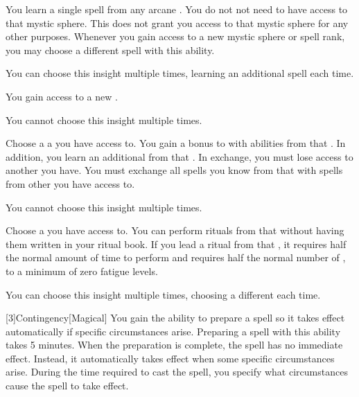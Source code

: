         {
             You learn a single spell from any arcane .
            You do not not need to have access to that mystic sphere.
            This does not grant you access to that mystic sphere for any other purposes.
            Whenever you gain access to a new mystic sphere or spell rank, you may choose a different spell with this ability.
            \par You can choose this insight multiple times, learning an additional spell each time.

             You gain access to a new .
            \par You cannot choose this insight multiple times.

             Choose a a  you have access to.
            You gain a  bonus to  with abilities from that .
            In addition, you learn an additional  from that .
            In exchange, you must lose access to another  you have.
            You must exchange all spells you know from that  with spells from other  you have access to.
            \par You cannot choose this insight multiple times.

            Choose a  you have access to.
            You can perform rituals from that  without having them written in your ritual book.
            If you lead a ritual from that , it requires half the normal amount of time to perform and requires half the normal number of , to a minimum of zero fatigue levels.
            \par You can choose this insight multiple times, choosing a different  each time.
        }

        [3]{Contingency}[Magical] You gain the ability to prepare a spell so it takes effect automatically if specific circumstances arise.
        Preparing a spell with this ability takes 5 minutes.
        When the preparation is complete, the spell has no immediate effect.
        Instead, it automatically takes effect when some specific circumstances arise.
        During the time required to cast the spell, you specify what circumstances cause the spell to take effect.

